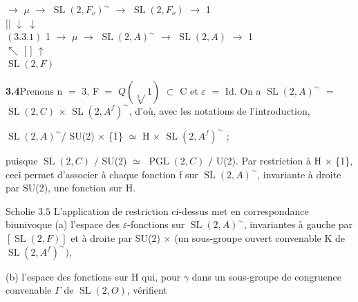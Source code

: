 \documentclass[10pt,a4paper]{article}
\begin{document}
\par\smallskip\begin{center}\begin{minipage}{0.96\textwidth} $\to{}$ $\mu{}$ $\to{}$ $\operatorname{SL}(2,F_\nu{})^\sim$ $\to{}$ $\operatorname{SL}(2,F_\nu{})$ $\to{}$ 1 \\ || $\downarrow{}$ $\downarrow{}$ \\ $(3.3.1)$ 1 $\to{}$ $\mu{}$ $\to{}$ $\operatorname{SL}(2,A)^\sim$ $\to{}$ $\operatorname{SL}(2,A)$ $\to{}$ 1 \\ $\nwarrow{}$ [ ] $\uparrow{}$ \\ $\operatorname{SL}(2,F)$
\end{minipage}\end{center}\smallskip
\par\noindent\textbf{3.4}\quad Prenons n $=$ 3, F $=$ $Q(\sqrt[3]{}1)$ $\subset{}$ C et $\varepsilon{}$ $=$ Id. On a $\operatorname{SL}(2,A)^\sim$ $=$ $\operatorname{SL}(2,C)$ $\times{}$ $\operatorname{SL}(2,A^f)^\sim$, d'où, avec les notations de l'introduction,\par
\par\smallskip\begin{center}\begin{minipage}{0.96\textwidth}\centering
$\operatorname{SL}(2,A)^\sim/$ SU(2) $\times{}$ \{1\} $\simeq{}$ H $\times{}$ $\operatorname{SL}(2,A^f)^\sim$ ;
\end{minipage}\end{center}\smallskip
\par puisque $\operatorname{SL}(2,C)$ $/$ SU(2) $\simeq{}$ $\operatorname{PGL}(2,C)$ $/$ U(2). Par restriction à H $\times{}$ \{1\}, ceci permet d'associer à chaque fonction f sur $\operatorname{SL}(2,A)^\sim$, invariante à droite par SU(2), une fonction sur H.\par
\par Scholie $3.5$ L'application de restriction ci-dessus met en correspondance biunivoque (a) l'espace des $\varepsilon{}$-fonctions sur $\operatorname{SL}(2,A)^\sim$, invariantes à gauche par $[\operatorname{SL}(2,F)]$ et à droite par SU(2) $\times{}$ (un sous-groupe ouvert convenable K de $\operatorname{SL}(2,A^f)^\sim)$,\par
\par (b) l'espace des fonctions sur H qui, pour $\gamma{}$ dans un sous-groupe de congruence convenable $\Gamma{}$ de $\operatorname{SL}(2,O)$, vérifient\par
\end{document}
